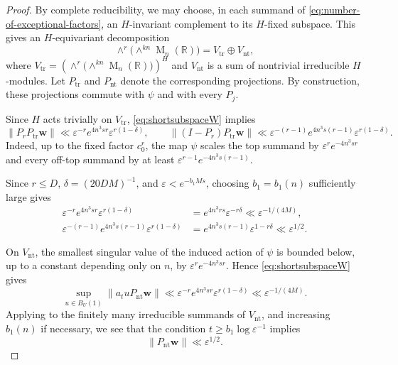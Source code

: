 \documentclass[reqno,11pt]{amsart}
\numberwithin{equation}{section}
\theoremstyle{definition}
\theoremstyle{remark}
\newcommand{\op}{\operatorname}
\newcommand{\M}{\op{M}}
\begin{document}
\begin{proof}
By complete reducibility, we may choose, in each summand of
\eqref{eq:number-of-exceptional-factors}, an $H$-invariant complement
to its $H$-fixed subspace. This gives an $H$-equivariant decomposition
$$
\wedge^r\bigl(\wedge^{kn}\M_n(\mathbb R)\bigr)
=
V_{\mathrm{tr}}\oplus V_{\mathrm{nt}},
$$
where
$V_{\mathrm{tr}}=\left(
\wedge^r\bigl(\wedge^{kn}\M_n(\mathbb R)\bigr)
\right)^H$
and $V_{\mathrm{nt}}$ is a sum of nontrivial irreducible
$H$-modules. Let $P_{\mathrm{tr}}$ and $P_{\mathrm{nt}}$ denote the
corresponding projections. By construction, these projections commute
with $\psi$ and with every $P_j$.

Since $H$ acts trivially on $V_{\mathrm{tr}}$,
\eqref{eq:shortsubspaceW} implies
\begin{equation}\label{eq:trivial-top-bound}
\|P_rP_{\mathrm{tr}}\mathbf w\|
\ll
\varepsilon^{-r}e^{4n^3sr}
\varepsilon^{r(1-\delta)},
\qquad
\|(I-P_r)P_{\mathrm{tr}}\mathbf w\|
\ll
\varepsilon^{-(r-1)}e^{4n^3s(r-1)}
\varepsilon^{r(1-\delta)}.
\end{equation}
Indeed, up to the fixed factor $c_0^r$, the map $\psi$ scales the
top summand by $\varepsilon^re^{-4n^3sr}$ and every off-top summand
by at least
$\varepsilon^{r-1}e^{-4n^3s(r-1)}$.

Since $r\le D$, $\delta=(20DM)^{-1}$, and
$\varepsilon<e^{-b_1Ms}$, choosing $b_1=b_1(n)$ sufficiently large
gives
\begin{align}
\varepsilon^{-r}e^{4n^3sr}\varepsilon^{r(1-\delta)}
&=
e^{4n^3rs}\varepsilon^{-r\delta}
\ll
\varepsilon^{-1/(4M)},
\label{eq:top-exponent-bookkeeping}\\
\varepsilon^{-(r-1)}e^{4n^3s(r-1)}
\varepsilon^{r(1-\delta)}
&=
e^{4n^3s(r-1)}\varepsilon^{1-r\delta}
\ll
\varepsilon^{1/2}.
\label{eq:offtop-exponent-bookkeeping}
\end{align}

On $V_{\mathrm{nt}}$, the smallest singular value of the induced
action of $\psi$ is bounded below, up to a constant depending only on
$n$, by $\varepsilon^re^{-4n^3sr}$. Hence
\eqref{eq:shortsubspaceW} gives
$$
\sup_{u\in B_U(1)}
\|a_tuP_{\mathrm{nt}}\mathbf w\|
\ll
\varepsilon^{-r}e^{4n^3sr}
\varepsilon^{r(1-\delta)}
\ll
\varepsilon^{-1/(4M)}.
$$
Applying  to the finitely many irreducible
summands of $V_{\mathrm{nt}}$, and increasing $b_1(n)$ if necessary,
we see that the condition $t\ge b_1\log\varepsilon^{-1}$ implies
\begin{equation}\label{eq:expansionboundirr1}
\|P_{\mathrm{nt}}\mathbf w\|
\ll
\varepsilon^{1/2}.
\end{equation}


\end{proof}
\end{document}
